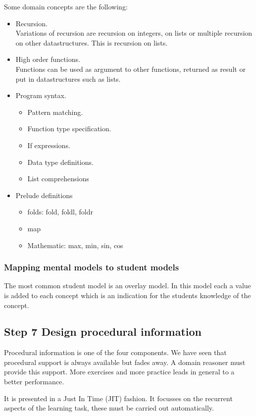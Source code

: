 Some domain concepts are the following:
\begin{itemize}
\item Recursion. \\
Variations of recursion are recursion on integers, on lists or  multiple recursion on other datastructures. 
This is recursion on lists.
\item High order functions. \\
Functions can be used as argument to other functions, returned as result or put in datastructures such as lists.
\item Program syntax.
\begin{itemize}
\item Pattern matching.
\item Function type specification.
\item If expressions.
\item Data type definitions.
\item List comprehensions
\end{itemize}
\item Prelude definitions
\begin{itemize}
\item folds: fold,  foldl, foldr
\item map 
\item Mathematic: max, min, sin, cos
\end{itemize}


\end{itemize}


\subsubsection{Mapping mental models to student models}
The most common student model is an overlay model.
In this model each a value is added to each concept which is an indication for the students knowledge of the concept.




\subsection{Step 7 Design procedural information}
Procedural information is one of the four components.
We have seen that procedural support is always available but fades away.
A domain reasoner must provide this support.
More exercises and more practice leads in general to a better performance.

It is presented in a Just In Time (JIT) fashion.
It focusses on the recurrent aspects of the learning task, these must be carried out automatically.

